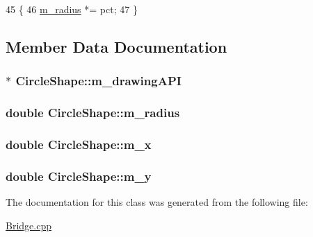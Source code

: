 \begin{DoxyCode}
45                                        \{
46       \hyperlink{classCircleShape_a86f17472715fcc9dc0801876e563fbd0}{m\_radius} *= pct;
47    \}
\end{DoxyCode}


\subsection{Member Data Documentation}
\subsubsection[{\texorpdfstring{m\+\_\+drawing\+A\+PI}{m_drawingAPI}}]{$\ast$ Circle\+Shape\+::m\+\_\+drawing\+A\+PI\hspace{0.3cm}{\ttfamily [private]}}\hypertarget{classCircleShape_a9216b90cab92f99f48866e8af921aa5e}{}\label{classCircleShape_a9216b90cab92f99f48866e8af921aa5e}
\subsubsection[{\texorpdfstring{m\+\_\+radius}{m_radius}}]{\setlength{\rightskip}{0pt plus 5cm}double Circle\+Shape\+::m\+\_\+radius\hspace{0.3cm}{\ttfamily [private]}}\hypertarget{classCircleShape_a86f17472715fcc9dc0801876e563fbd0}{}\label{classCircleShape_a86f17472715fcc9dc0801876e563fbd0}
\subsubsection[{\texorpdfstring{m\+\_\+x}{m_x}}]{\setlength{\rightskip}{0pt plus 5cm}double Circle\+Shape\+::m\+\_\+x\hspace{0.3cm}{\ttfamily [private]}}\hypertarget{classCircleShape_a75a53e0b319fcdc17afdca4aa1e43269}{}\label{classCircleShape_a75a53e0b319fcdc17afdca4aa1e43269}
\subsubsection[{\texorpdfstring{m\+\_\+y}{m_y}}]{\setlength{\rightskip}{0pt plus 5cm}double Circle\+Shape\+::m\+\_\+y\hspace{0.3cm}{\ttfamily [private]}}\hypertarget{classCircleShape_a0889d40af7e693db62c2bb8c67182e75}{}\label{classCircleShape_a0889d40af7e693db62c2bb8c67182e75}


The documentation for this class was generated from the following file\+:\begin{DoxyCompactItemize}
\item 
\hyperlink{Bridge_8cpp}{Bridge.\+cpp}\end{DoxyCompactItemize}
